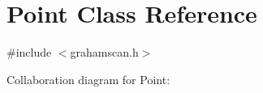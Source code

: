 \hypertarget{classPoint}{}\section{Point Class Reference}
\label{classPoint}


{\ttfamily \#include $<$grahamscan.\+h$>$}



Collaboration diagram for Point\+:

